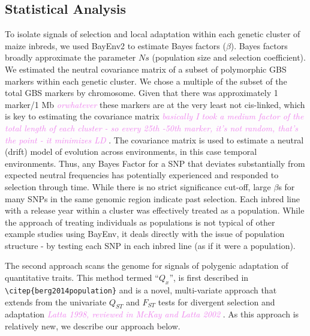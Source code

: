 \documentclass[9pt,twocolumn,twoside]{gsajnl}
\newcommand{\kc}[1]{\textcolor{violet}{ \emph{ #1}} }
\begin{document}
\subsection*{Statistical Analysis} 
To isolate signals of selection and local adaptation within each genetic cluster of maize inbreds, we used BayEnv2 \citep{Coop:2010ke} to estimate Bayes factors ($\beta$). Bayes factors broadly approximate the parameter $Ns$ (population size and selection coefficient).
We estimated the neutral covariance matrix of a subset of polymorphic GBS markers within each genetic cluster. We chose a multiple of the subset of the total GBS markers by chromosome. 
Given that there was approximately 1 marker/1 Mb \kc{orwhatever} these markers are at the very least not cis-linked, which is key to estimating the covariance matrix \kc{basically I took a medium factor of the total length of each cluster - so every 25th -50th marker, it's not random, that's the point - it minimizes LD}. 
The covariance matrix is used to estimate a neutral (drift) model of evolution across environments, in this case temporal environments. 
Thus, any Bayes Factor for a SNP that deviates substantially from expected neutral frequencies has potentially experienced and responded to selection through time.  While there is no strict significance cut-off, large $\beta$s for many SNPs in the same genomic region indicate past selection.
Each inbred line with a release year within a cluster was effectively treated as a population. 
While the approach of treating individuals as populations is not typical of other example studies using BayEnv, it deals directly with the issue of population structure - by testing each SNP in each inbred line (as if it were a population). 

The second approach scans the genome for signals of polygenic adaptation of quantitative traits. This method termed ``$Q_x$'', is first described in \verb|\citep{berg2014population}| and is a novel, multi-variate approach that extends from the univariate $Q_{ST}$ and $F_{ST}$ tests for divergent selection and adaptation \kc{Latta 1998, reviewed in McKay and Latta 2002}. 
As this approach is relatively new, we describe our approach below.
\end{document}
